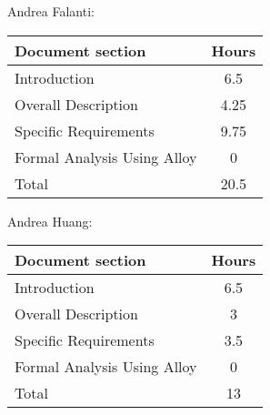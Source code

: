 Andrea Falanti:

\begin{tabular}{|l|c|}
    \hline
    Document section & Hours \\
    \hline
     Introduction & 6.5\\
     Overall Description & 4.25\\
     Specific Requirements & 9.75\\
     Formal Analysis Using Alloy & 0\\
     \hline
     Total & 20.5\\
     \hline
\end{tabular}
\vskip 0.3in

Andrea Huang:

\begin{tabular}{|l|c|}
    \hline
    Document section & Hours \\
    \hline
     Introduction &  6.5\\
     Overall Description & 3\\
     Specific Requirements & 3.5\\
     Formal Analysis Using Alloy & 0\\
     \hline
     Total & 13\\
     \hline
\end{tabular}